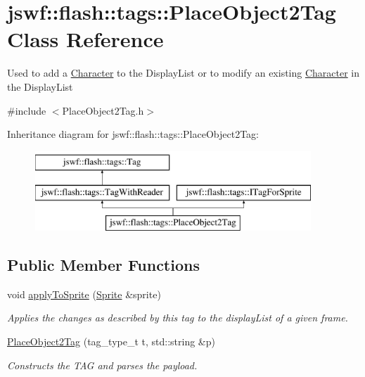 \hypertarget{classjswf_1_1flash_1_1tags_1_1_place_object2_tag}{\section{jswf\+:\+:flash\+:\+:tags\+:\+:Place\+Object2\+Tag Class Reference}
\label{classjswf_1_1flash_1_1tags_1_1_place_object2_tag}
}


Used to add a {\ttfamily \hyperlink{classjswf_1_1flash_1_1_character}{Character}} to the {\ttfamily Display\+List} or to modify an existing {\ttfamily \hyperlink{classjswf_1_1flash_1_1_character}{Character}} in the {\ttfamily Display\+List}  




{\ttfamily \#include $<$Place\+Object2\+Tag.\+h$>$}

Inheritance diagram for jswf\+:\+:flash\+:\+:tags\+:\+:Place\+Object2\+Tag\+:\begin{figure}[H]
\begin{center}
\leavevmode
\includegraphics[height=3.000000cm]{classjswf_1_1flash_1_1tags_1_1_place_object2_tag}
\end{center}
\end{figure}
\subsection*{Public Member Functions}
\begin{DoxyCompactItemize}
\item 
void \hyperlink{classjswf_1_1flash_1_1tags_1_1_place_object2_tag_a69e53021c0b0a8c144331dc889619870}{apply\+To\+Sprite} (\hyperlink{classjswf_1_1flash_1_1_sprite}{Sprite} \&sprite)
\begin{DoxyCompactList}\small\item\em Applies the changes as described by this tag to the display\+List of a given frame. \end{DoxyCompactList}\item 
\hypertarget{classjswf_1_1flash_1_1tags_1_1_place_object2_tag_aa36a35f84d3e88569735508a4a09fe07}{\hyperlink{classjswf_1_1flash_1_1tags_1_1_place_object2_tag_aa36a35f84d3e88569735508a4a09fe07}{Place\+Object2\+Tag} (tag\+\_\+type\+\_\+t t, std\+::string \&p)}\label{classjswf_1_1flash_1_1tags_1_1_place_object2_tag_aa36a35f84d3e88569735508a4a09fe07}

\begin{DoxyCompactList}\small\item\em Constructs the {\ttfamily T\+A\+G} and parses the payload. \end{DoxyCompactList}\end{DoxyCompactItemize}
